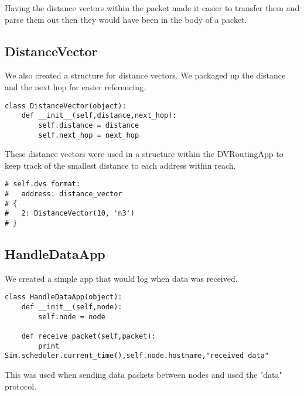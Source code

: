 \documentclass[11pt]{article}
\begin{document}
Having the distance vectors within the packet made it easier to transfer them and parse them out then they would have been in the body of a packet. 

\subsection{DistanceVector}

We also created a structure for distance vectors. We packaged up the distance and the next hop for easier referencing.

\vspace{5mm}

\begin{lstlisting}
class DistanceVector(object):
    def __init__(self,distance,next_hop):
        self.distance = distance
        self.next_hop = next_hop
\end{lstlisting}

\vspace{5mm}

These distance vectors were used in a structure within the DVRoutingApp to keep track of the smallest distance to each address within reach.

\vspace{5mm}

\begin{lstlisting}
# self.dvs format:
#   address: distance_vector
# {
#   2: DistanceVector(10, 'n3')
# }
\end{lstlisting}

\vspace{5mm}

\subsection{HandleDataApp}

We created a simple app that would log when data was received.

\vspace{5mm}

\begin{lstlisting}
class HandleDataApp(object):
    def __init__(self,node):
        self.node = node

    def receive_packet(self,packet):
        print Sim.scheduler.current_time(),self.node.hostname,"received data"
\end{lstlisting}

\vspace{5mm}

This was used when sending data packets between nodes and used the "data" protocol.
\end{document}
